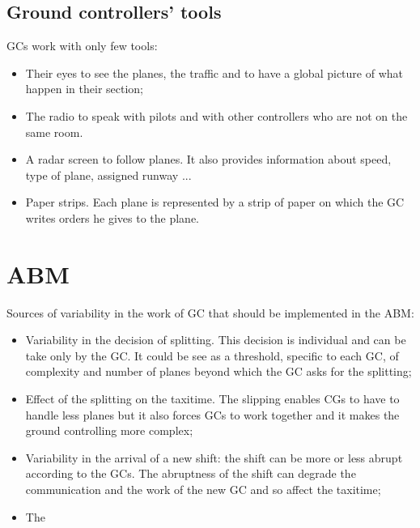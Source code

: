\documentclass{article}
\begin{document}
\subsection{Ground controllers' tools}
GCs work with only few tools:
\begin{itemize}
    \item Their eyes to see the planes, the traffic and to have a global picture of what happen in their section;
    \item The radio to speak with pilots and with other controllers who are not on the same room. 
    \item A radar screen to follow planes. It also provides information about speed, type of plane, assigned runway ...
    \item Paper strips. Each plane is represented by a strip of paper on which the GC writes orders he gives to the plane. 
\end{itemize}
\section{ABM}
Sources of variability in the work of GC that should be implemented in the ABM:
\begin{itemize}
    \item Variability in the decision of splitting. This decision is individual and can be take only by the GC. It could be see as a threshold, specific to each GC, of complexity and number of planes beyond which the GC asks for the splitting;
    \item Effect of the splitting on the taxitime. The slipping enables CGs to have to handle less planes but it also forces GCs to work together and it makes the ground controlling more complex;
    \item Variability in the arrival of a new shift: the shift can be more or less abrupt according to the GCs. The abruptness of the shift can degrade the communication and the work of the new GC and so affect the taxitime;
    \item The 
\end{itemize}
\end{document}

